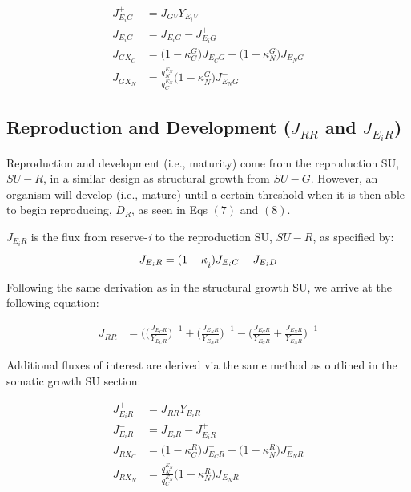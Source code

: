 \documentclass[
]{article}
\begin{document}
\begin{align}
J_{E_{i}G}^{+} &= {J_{GV}}{Y_{{E_i}V}}
\\
J_{E_{i}G}^{-} &= J_{{E_i}G} - J_{E_{i}G}^{+}
\\
J_{G{X{_C}}} &= \biggl(1-\kappa_{C}^{G}\biggr)J_{E_{C}G}^{-} + \biggl(1-\kappa_{N}^{G}\biggr)J_{E_{N}G}^{-}
\\
J_{G{X{_N}}} &= \frac{q^{E_N}_N}{q^{E_N}_C}\biggl(1-\kappa_{N}^{G}\biggr)J_{E_{N}G}^{-}
\end{align}

\newpage

\subsection{\texorpdfstring{Reproduction and Development (\(J_{RR}\) and
\(J_{E_{i}R}\))}{Reproduction and Development (J\_\{RR\} and J\_\{E\_\{i\}R\})}}\label{reproduction-and-development-j_rr-and-j_e_ir}

Reproduction and development (i.e., maturity) come from the reproduction
SU, \(SU-R\), in a similar design as structural growth from \(SU-G\).
However, an organism will develop (i.e., mature) until a certain
threshold when it is then able to begin reproducing, \(D_R\), as seen in
Eqs \((7)\) and \((8)\).

\(J_{E_{i}R}\) is the flux from reserve-\emph{i} to the reproduction SU,
\(SU-R\), as specified by: \begin{equation}
J_{E_{i}R}=(1-{\kappa\strut_{i}}) J_{E_{i}C}-J_{E_{i}D}
\end{equation}

Following the same derivation as in the structural growth SU, we arrive
at the following equation:

\begin{align}
  J_{RR} &= \biggl(\biggl(\frac{J_{E_{C}R}}{Y_{{E_C}R}}\biggr)^{-1} + \biggl(\frac{J_{E_{N}R}}{Y_{{E_N}R}}\biggr)^{-1} - \biggl(\frac{J_{E_{C}R}}{Y_{{E_C}R}} + \frac{J_{E_{N}R}}{Y_{{E_N}R}}\biggr)^{-1}
\end{align}

Additional fluxes of interest are derived via the same method as
outlined in the somatic growth SU section:

\begin{align}
J_{E_{i}R}^{+} &= {J_{RR}}{Y_{{E_i}R}}
\\
J_{E_{i}R}^{-} &= J_{{E_i}R} - J_{E_{i}R}^{+}
\\
J_{R{X{_C}}} &= \biggl(1-\kappa_{C}^{R}\biggr)J_{E_{C}R}^{-} + \biggl(1-\kappa_{N}^{R}\biggr)J_{E_{N}R}^{-}
\\
J_{R{X{_N}}} &= \frac{q^{E_N}_N}{q^{E_N}_C}\biggl(1-\kappa_{N}^{R}\biggr)J_{E_{N}R}^{-}
\end{align}
\end{document}

